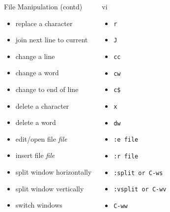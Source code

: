 \documentclass[slidestop,mathserif,compress,xcolor=svgnames]{beamer}
\newenvironment{eblock}[0]
{
\begin{beamerboxesrounded}[upper=uppercol2,lower=lowercol2,shadow=true]}
{\end{beamerboxesrounded}}
\begin{document}
\begin{frame}[allowframebreaks]
{\begin{columns}
  \end{columns}
  }
  \framebreak
  {\scriptsize
  \begin{columns}
     \vspace{-0.5cm}
    \begin{eblock}{File Manipulation (contd)}
    \begin{itemize}
      \item replace a character
      \item join next line to current
      \item change a line
      \item change a word
      \item change to end of line
      \item delete a character
      \item delete a word
      \item edit/open file \textit{file}
      \item insert file \textit{file}
      \item split window horizontally
      \item split window vertically
      \item switch windows
    \end{itemize}
    \end{eblock}
     \vspace{-0.5cm}
    \begin{eblock}{vi}
    \begin{itemize}
      \item \texttt{r}
      \item \texttt{J}
      \item \texttt{cc}
      \item \texttt{cw}
      \item \texttt{c\$}
      \item \texttt{x}
      \item \texttt{dw}
      \item \texttt{:e \texttt{file}}
      \item \texttt{:r \texttt{file}}
      \item \texttt{:split or C-ws}
      \item \texttt{:vsplit or C-wv}
      \item \texttt{C-ww}
    \end{itemize}
    \end{eblock}
     \vspace{-0.5cm}

\end{columns}}
\end{frame}
\end{document}
